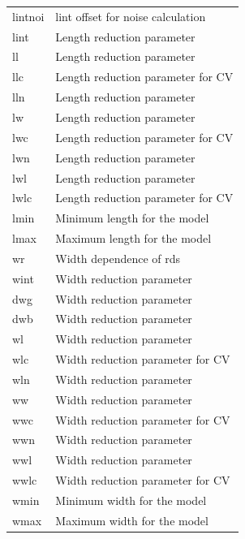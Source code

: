 \begin{longtable}{l l}
{\small lintnoi} & {\small lint offset for noise calculation} \\
{\small lint} & {\small Length reduction parameter} \\
{\small ll} & {\small Length reduction parameter} \\
{\small llc} & {\small Length reduction parameter for CV} \\
{\small lln} & {\small Length reduction parameter} \\
{\small lw} & {\small Length reduction parameter} \\
{\small lwc} & {\small Length reduction parameter for CV} \\
{\small lwn} & {\small Length reduction parameter} \\
{\small lwl} & {\small Length reduction parameter} \\
{\small lwlc} & {\small Length reduction parameter for CV} \\
{\small lmin} & {\small Minimum length for the model} \\
{\small lmax} & {\small Maximum length for the model} \\

{\small wr} & {\small Width dependence of rds} \\
{\small wint} & {\small Width reduction parameter} \\
{\small dwg} & {\small Width reduction parameter} \\
{\small dwb} & {\small Width reduction parameter} \\

{\small wl} & {\small Width reduction parameter} \\
{\small wlc} & {\small Width reduction parameter for CV} \\
{\small wln} & {\small Width reduction parameter} \\
{\small ww} & {\small Width reduction parameter} \\
{\small wwc} & {\small Width reduction parameter for CV} \\
{\small wwn} & {\small Width reduction parameter} \\
{\small wwl} & {\small Width reduction parameter} \\
{\small wwlc} & {\small Width reduction parameter for CV} \\
{\small wmin} & {\small Minimum width for the model} \\
{\small wmax} & {\small Maximum width for the model} \\


\end{longtable}
